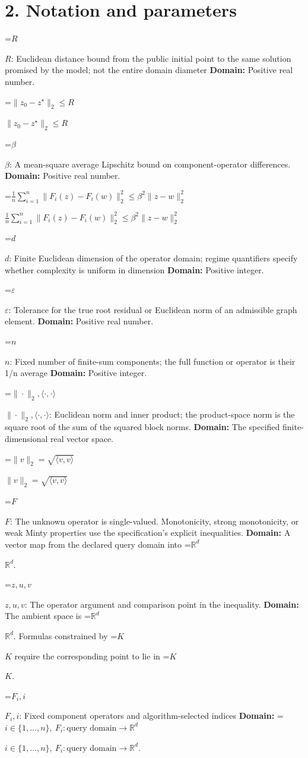 \documentclass[10pt,a4paper]{article}
\newcommand{\AtlasMath}[1]{\par\begingroup\centering\setbox0=\hbox{$\displaystyle #1$}\ifdim\wd0>1.4\linewidth\typeout{ATLAS WIDE FORMULA: \the\wd0}\fi\ifdim\wd0>\linewidth\resizebox{\linewidth}{!}{\box0}\else\box0\fi\par\endgroup}
\newcommand{\AtlasInlineMath}[1]{\begingroup\setbox0=\hbox{$#1$}\ifdim\wd0>.4\linewidth\endgroup\AtlasMath{#1}\else\endgroup$#1$\fi}
\begin{document}
\section{2. Notation and parameters}
\AtlasInlineMath{R}: Euclidean distance bound from the public initial point to the same solution promised by the model; not the entire domain diameter \textbf{Domain:} Positive real number.

\AtlasInlineMath{\|z_0-z^\star\|_2\le R}

\AtlasInlineMath{\beta}: A mean-square average Lipschitz bound on component-operator differences. \textbf{Domain:} Positive real number.

\AtlasInlineMath{\frac1n\sum_{i=1}^n\|F_i(z)-F_i(w)\|_2^2\le\beta^2\|z-w\|_2^2}

\AtlasInlineMath{d}: Finite Euclidean dimension of the operator domain; regime quantifiers specify whether complexity is uniform in dimension \textbf{Domain:} Positive integer.

\AtlasInlineMath{\varepsilon}: Tolerance for the true root residual or Euclidean norm of an admissible graph element. \textbf{Domain:} Positive real number.

\AtlasInlineMath{n}: Fixed number of finite-sum components; the full function or operator is their 1/n average \textbf{Domain:} Positive integer.

\AtlasInlineMath{\|\cdot\|_2,\langle\cdot,\cdot\rangle}: Euclidean norm and inner product; the product-space norm is the square root of the sum of the squared block norms. \textbf{Domain:} The specified finite-dimensional real vector space.

\AtlasInlineMath{\|v\|_2=\sqrt{\langle v,v\rangle}}

\AtlasInlineMath{F}: The unknown operator is single-valued. Monotonicity, strong monotonicity, or weak Minty properties use the specification’s explicit inequalities. \textbf{Domain:} A vector map from the declared query domain into \AtlasInlineMath{\mathbb R^d}.

\AtlasInlineMath{z,u,v}: The operator argument and comparison point in the inequality. \textbf{Domain:} The ambient space is \AtlasInlineMath{\mathbb R^d}. Formulas constrained by \AtlasInlineMath{K} require the corresponding point to lie in \AtlasInlineMath{K}.

\AtlasInlineMath{F_i,i}: Fixed component operators and algorithm-selected indices \textbf{Domain:} \AtlasInlineMath{i\in\{1,\ldots,n\},\ F_i:\text{query domain}\to\mathbb R^d}.
\end{document}

